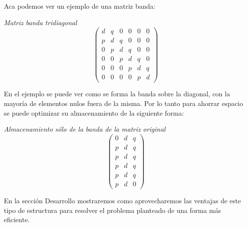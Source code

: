 Aca podemos ver un ejemplo de una matriz banda:

\emph{ Matriz banda tridiagonal } 
\[ \left( \begin{array}{ccccccc}
d & q & 0 & 0 & 0 & 0 \\
p & d & q & 0 & 0 & 0 \\
0 & p & d & q & 0 & 0 \\
0 & 0 & p & d & q & 0 \\
0 & 0 & 0 & p & d & q \\
0 & 0 & 0 & 0 & p & d \end{array} 
\right)\] 

En el ejemplo se puede ver como se forma la banda sobre la diagonal, con la mayoría de elementos nulos fuera de la misma. Por lo tanto para ahorrar espacio se puede optimizar su almacenamiento de la siguiente forma:

\emph{ Almacenamiento sólo de la banda de la matriz original } 
\[ \left( \begin{array}{ccc}
0 & d & q \\
p & d & q \\
p & d & q \\
p & d & q \\
p & d & q \\
p & d & 0 \end{array} 
\right)\] 


En la sección Desarrollo mostraremos como aprovecharemos las ventajas de este tipo de estructura para resolver el problema planteado de una forma más eficiente. 





